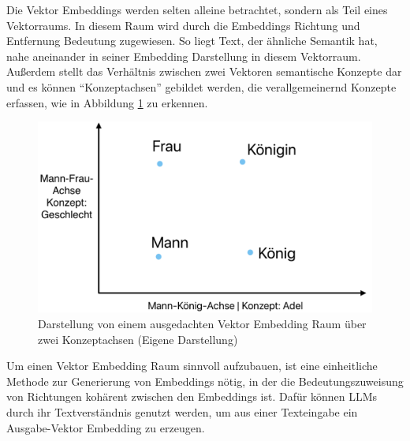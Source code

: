 \documentclass[../main.tex]{subfiles}
\begin{document}
Die Vektor Embeddings werden selten alleine betrachtet, sondern als Teil eines Vektorraums.
In diesem Raum wird durch die Embeddings Richtung und Entfernung Bedeutung zugewiesen.
So liegt Text, der ähnliche Semantik hat, nahe aneinander in seiner Embedding Darstellung in diesem Vektorraum.
Außerdem stellt das Verhältnis zwischen zwei Vektoren semantische Konzepte dar und es können \enquote{Konzeptachsen} gebildet werden, die verallgemeinernd Konzepte erfassen, wie in Abbildung \ref{fig:embeddingspace} zu erkennen.
\cite{heimerl2018interactive,mikolov2013efficient}

\begin{figure}[ht]
    \centering
    \includegraphics[scale=.23]{"bilder/embeddingspace.png"}
    \caption{Darstellung von einem ausgedachten Vektor Embedding Raum über zwei Konzeptachsen (Eigene Darstellung)}
    \label{fig:embeddingspace}
\end{figure}

Um einen Vektor Embedding Raum sinnvoll aufzubauen, ist eine einheitliche Methode zur Generierung von Embeddings nötig, in der die Bedeutungszuweisung von Richtungen kohärent zwischen den Embeddings ist.
Dafür können \glspl{LLM} durch ihr Textverständnis genutzt werden, um aus einer Texteingabe ein Ausgabe-Vektor Embedding zu erzeugen.
\cite{zhang2023language}
\end{document}
